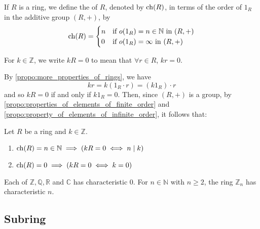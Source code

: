 \begin{defn}
\label{defn:characteristic_of_a_ring}
  If $R$ is a ring, we define the  of $R$, denoted by $\operatorname{ch}(R)$, in terms of the order of $1_R$ in the additive group $(R, +)$, by
  \begin{equation*}
    \operatorname{ch}(R) = \begin{cases}
      n & \text{if } o(1_R) = n \in \mathbb{N} \text{ in } (R, +) \\
      0 & \text{if } o(1_R) = \infty \text{ in } (R, +)
    \end{cases}
  \end{equation*}
\end{defn}

For $k \in \mathbb{Z}$, we write $kR = 0$ to mean that $\forall r \in R$, $kr = 0$.

By \cref{propo:more_properties_of_rings}, we have
\begin{equation*}
  kr = k (1_R \cdot r) = (k 1_R) \cdot r
\end{equation*}
and so $kR = 0$ if and only if $k 1_R = 0$. Then, since $(R, +)$ is a group, by \cref{propo:properties_of_elements_of_finite_order} and \cref{propo:property_of_elements_of_infinite_order}, it follows that:

\begin{propo}
\label{propo:implications_of_the_characteristic}
  Let $R$ be a ring and $k \in \mathbb{Z}$.
  \begin{enumerate}
    \item $\operatorname{ch}(R) = n \in \mathbb{N} \implies \left( kR = 0 \iff n \mid k \right)$
    \item $\operatorname{ch}(R) = 0 \implies \left( kR = 0 \iff k = 0 \right)$
  \end{enumerate}
\end{propo}

\begin{eg}
  Each of $\mathbb{Z}, \mathbb{Q}, \mathbb{R}$ and $\mathbb{C}$ has characteristic $0$. For $n \in \mathbb{N}$ with $n \geq 2$, the ring $\mathbb{Z}_n$ has characteristic $n$.
\end{eg}


\subsection{Subring}%
\label{sub:subring}

